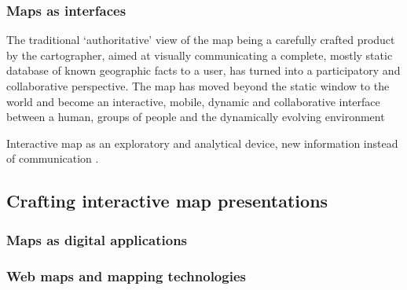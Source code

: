 



\subsubsection{Maps as interfaces}

\parencite{kra2017}
The traditional ‘authoritative’ view of the map being a carefully crafted product
by the cartographer, aimed at visually communicating a complete, mostly static database
of known geographic facts to a user, has turned into a participatory and collaborative perspective.
The map has moved beyond the static window to the world and become an
interactive, mobile, dynamic and collaborative interface between a human, groups of
people and the dynamically evolving environment

Interactive map as an exploratory and analytical device, new information instead of communication \parencite{gri2017}.


\textcite{rot2013a, rot2013b}

\subsection{Crafting interactive map presentations}
\subsubsection{Maps as digital applications}

\subsubsection{Web maps and mapping technologies}

